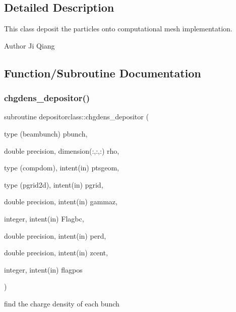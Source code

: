\subsection{Detailed Description}
This class deposit the particles onto computational mesh implementation. 

\begin{DoxyAuthor}{Author}
Ji Qiang 
\end{DoxyAuthor}


\subsection{Function/\+Subroutine Documentation}
\mbox{\label{namespacedepositorclass_adea4a5f5ed3c85a2ef236eaa94f10b98}} 
\subsubsection{\texorpdfstring{chgdens\_depositor()}{chgdens\_depositor()}}
{\footnotesize\ttfamily subroutine depositorclass\+::chgdens\+\_\+depositor (\begin{DoxyParamCaption}\item[{type (beambunch)}]{pbunch,  }\item[{double precision, dimension(\+:,\+:,\+:)}]{rho,  }\item[{type (compdom), intent(in)}]{ptsgeom,  }\item[{type (pgrid2d), intent(in)}]{pgrid,  }\item[{double precision, intent(in)}]{gammaz,  }\item[{integer, intent(in)}]{Flagbc,  }\item[{double precision, intent(in)}]{perd,  }\item[{double precision, intent(in)}]{zcent,  }\item[{integer, intent(in)}]{flagpos }\end{DoxyParamCaption})}



find the charge density of each bunch 

